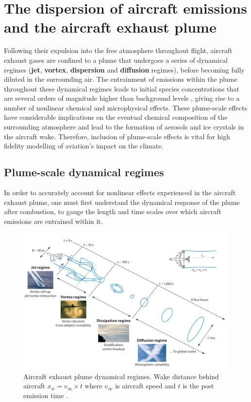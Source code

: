 \section{The dispersion of aircraft emissions and the aircraft exhaust plume}
Following their expulsion into the free atmosphere throughout flight, aircraft exhaust gases are confined to a plume that undergoes a series of dynamical regimes (\textbf{jet}, \textbf{vortex}, \textbf{dispersion} and \textbf{diffusion} regimes), before becoming fully diluted in the surrounding air. The entrainment of emissions within the plume throughout these dynamical regimes leads to initial species concentrations that are several orders of magnitude higher than background levels \cite{Danilin1994}, giving rise to a number of nonlinear chemical and microphysical effects. These plume-scale effects have considerable implications on the eventual chemical composition of the surrounding atmosphere and lead to the formation of aerosols and ice crystals in the aircraft wake. Therefore, inclusion of plume-scale effects is vital for high fidelity modelling of aviation's impact on the climate. %

\subsection{Plume-scale dynamical regimes}
In order to accurately account for nonlinear effects experienced in the aircraft exhaust plume, one must first understand the dynamical response of the plume after combustion, to gauge the length and time scales over which aircraft emissions are entrained within it. 

\begin{figure}[H]
  \centering
  \includegraphics[width=0.8\linewidth]{Dynamics.png}
  \caption{Aircraft exhaust plume dynamical regimes. Wake distance behind aircraft $x_w = v_\infty \times t$ where $v_\infty$ is aircraft speed and $t$ is the post emission time \cite{Paoli2016, Gerz1998}.}
  \label{Plume}
\end{figure}

